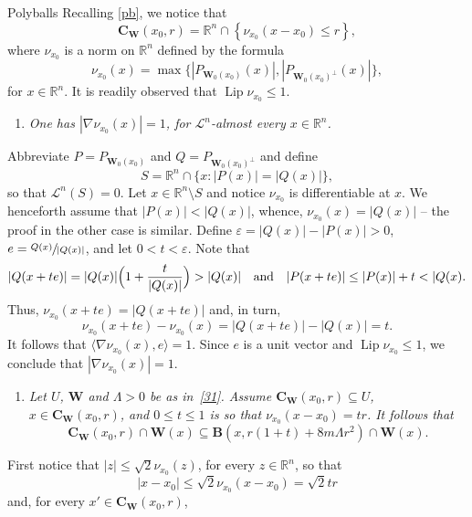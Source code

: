 \documentclass[JEP,XML,SOM,Unicode,ThmDefs,NoEqCountersInSection]{cedram}
\newcommand{\quand}{\quad\text{and}\quad}
\newenvironment{Empty}[2][\null]{%
\begin{enonce}[remark]{#1}#2}
{\end{enonce}}
\newcommand{\R}{\mathbb{R}}
\newcommand{\Rn}{\R^n}
\newcommand{\calL}{\mathscr{L}}
\newcommand{\bB}{{\boldsymbol{B}}}
\newcommand{\bC}{{\boldsymbol{C}}}
\newcommand{\bW}{{\boldsymbol{W}}}
\DeclareMathOperator{\rmLip}{\mathrm{Lip}}
\let\veps\varepsilon
\let\la\langle
\let\ra\rangle
\let\subset\subseteq
\begin{document}
\begin{Empty}[Polyballs]
\label{pb.complement}
Recalling \ref{pb}, we notice that
\begin{equation*}
\bC_{\bW}(x_0,r) = \Rn \cap \left\{ \nu_{x_0}(x-x_0) \leq r \right\},
\end{equation*}
where $\nu_{x_0}$ is a norm on $\Rn$ defined by the formula
\begin{equation*}
\nu_{x_0}(x) = \max \bigl\{ \left| P_{\bW_0(x_0)}(x) \right|, \left| P_{\bW_0(x_0)^\perp}(x) \right| \bigr\},
\end{equation*}
for $x \in \Rn$.
It is readily observed that $\rmLip \nu_{x_0} \leq 1$.
\begin{enumerate}
\item\label{enum:8.3.1} \emph{One has $|\nabla \nu_{x_0}(x) | = 1$, for $\calL^n$-almost every $x \in \Rn$.}
\end{enumerate}
\par
Abbreviate $P = P_{\bW_0(x_0)}$ and $Q = P_{\bW_0(x_0)^\perp}$ and define
\[
S = \Rn \cap \{ x: |P(x)| = |Q(x)| \},
\]
so that $\calL^n(S)=0$.
Let $x \in \Rn \setminus S$ and notice $\nu_{x_0}$ is differentiable at $x$.
We henceforth assume that $|P(x)| < |Q(x)|$, whence, $\nu_{x_0}(x) = |Q(x)|$ -- the proof in the other case is similar.
Define $\veps = |Q(x)| - |P(x)| > 0$, $e = \sfrac{Q(x)}{|Q(x)|}$, and let $0 < t < \veps$.
Note that
\[
|Q(x + te)| = |Q(x)| \Bigl(1 + \frac{t}{|Q(x)|}\Bigr) > |Q(x)|\quand|P(x + te)| \leq |P(x)| + t < |Q(x).
\]
Thus, $\nu_{x_0}(x+te) = |Q(x+te)|$ and, in turn,
\[
\nu_{x_0}(x+te) - \nu_{x_0}(x) = |Q(x+te)| - |Q(x)| = t.
\]
It follows that $\la \nabla \nu_{x_0}(x), e \ra = 1$.
Since $e$ is a unit vector and $\rmLip \nu_{x_0} \leq 1$, we conclude that $|\nabla \nu_{x_0}(x)| = 1$.
\begin{enumerate}
\item\label{enum:8.3.2} \emph{Let $U$, $\bW$ and $\Lambda > 0$ be as in~\ref{31}. Assume $\bC_{\bW}(x_0,r) \subset U$, $x \in \bC_{\bW}(x_0,r)$, and $0 \leq t \leq 1$ is so that $\nu_{x_0}(x-x_0) = tr$. It follows that
\begin{equation*}
\bC_{\bW}(x_0,r) \cap \bW(x) \subset \bB \left(x, r(1+t) + 8m\Lambda r^2\right) \cap \bW(x).
\end{equation*}
}
\end{enumerate}
\par
First notice that $|z| \leq \sqrt{2} \nu_{x_0}(z)$, for every $z \in \Rn$, so that
\[
|x-x_0| \leq \sqrt{2} \nu_{x_0}(x-x_0) = \sqrt{2} tr
\]
and, for every $x' \in \bC_\bW(x_0,r)$,

\end{Empty}
\end{document}
